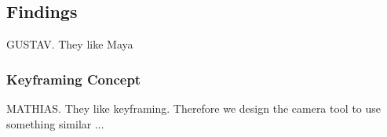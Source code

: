 \subsection{Findings}
GUSTAV. They like Maya
\subsubsection{Keyframing Concept}
MATHIAS. They like keyframing. Therefore we design the camera tool to use something similar ...